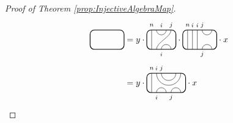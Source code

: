 \documentclass[11pt]{article}
\theoremstyle{plain}
\theoremstyle{definition}
\newcommand{\TLPlusPIso}[3]{
	\TLTStart
	\TLTThrough{#1}
	\TLTSnakeR{#2}{#3}
	\TLTEnd
}
\newcommand{\TLCapJoin}[5]{
	\TLTStart
	\TLTThrough{#1}
	\TLTCapJoin{#2}{#3}{#4}{#5}
	\TLTEnd
}
\newcommand{\TLTCalcLabelOffset}[3][0cm]{
	\settowidth{#2}{\scriptsize{$#3$}}
	\setlength{#2}{.5#2}
	\setlength{#2}{\maxof{#2}{#1}}
}
\newcommand{\TLTEnd}{
	\draw[thick, rounded corners = 5pt] (0,0) rectangle ($ (TLTlead) + (0,.8) $);
 \end{tikzpicture}
}
\newcommand{\TLTStart}{
 \begin{tikzpicture}[baseline=.3cm]
	\coordinate (TLTlead) at (.2,0); %
	\let\TLTlabelwidth\relax
	\newlength{\TLTlabelwidth}
}
\newcommand{\TLTThrough}[1]{
	\TLTCalcLabelOffset[.2cm]{\TLTlabelwidth}{#1}
	\coordinate (TLTlead) at ($ (TLTlead) + ({\TLTlabelwidth},0) $);
	\begin{scope}[shift=(TLTlead)]
		\draw (0,0) -- (0,.8);
		\node at (0,1) {\scriptsize{$#1$}};
	\end{scope}
		\coordinate (TLTlead) at ($ (TLTlead) + ({\TLTlabelwidth},0) $);
}
\newcommand{\TLTCapcup}[1]{
	\TLTCalcLabelOffset[.2cm]{\TLTlabelwidth}{#1}
		\coordinate (TLTlead) at ($ (TLTlead) + ({\TLTlabelwidth},0) $);
	\begin{scope}[shift=(TLTlead)]
		\draw (0,0) arc (180:0:.2);
		\draw (0,.8) arc (-180:0:.2);
		\node at (0,1) {\scriptsize{$#1$}};
	\end{scope}
	\TLTCalcLabelOffset[.5cm]{\TLTlabelwidth}{#1}
	\coordinate (TLTlead) at ($ (TLTlead) + ({\TLTlabelwidth},0)$);
}
\newcommand{\TLTSnakeR}[2]{
	\let\TLTscwidth\relax
	\newlength{\TLTscwidth}
	\let\TLTsswidth\relax
	\newlength{\TLTsswidth}
	\TLTCalcLabelOffset[.2cm]{\TLTscwidth}{#1}
	\TLTCalcLabelOffset[.5cm]{\TLTsswidth}{#2}
	\setlength{\TLTlabelwidth}{\TLTscwidth+\TLTsswidth}
	\setlength{\TLTlabelwidth}{\maxof{\TLTlabelwidth}{.7cm}} %
	\coordinate (TLTlead) at ($ (TLTlead) + ({\TLTscwidth},0) $);
	\begin{scope}[shift=(TLTlead)]
		\draw (.1,.8) arc (-180:0:.2cm);
		\draw (.1,0) .. controls ++(90:.3cm) and ++(270:.3cm) .. ($ (.1,.8) + ({\TLTlabelwidth},0) $);
		\draw ($ (.1,0) + ({\TLTsswidth},0) $) arc (180:0:.2cm);
		\node at (.1,1) {\scriptsize{$#1$}};
		\node at ($ (.1,1) + ({\TLTlabelwidth},0) $) {\scriptsize{$#2$}};
		\node at ($ (.1,-.2) + ({\TLTsswidth},0) $) {\scriptsize{$#1$}};
	\end{scope}
	\coordinate (TLTlead) at ($ (TLTlead) + ({\TLTlabelwidth+\TLTsswidth},0) $);
}
\newcommand{\TLTCapJoin}[4]{
	\let\TLTjoinlwidth\relax
	\newlength{\TLTjoinlwidth}
	\let\TLTjoinrwidth\relax
	\newlength{\TLTjoinrwidth}
	\let\TLTsplitlwidth\relax
	\newlength{\TLTsplitlwidth}
	\let\TLTsplitrwidth\relax
	\newlength{\TLTsplitrwidth}
	\TLTCalcLabelOffset[.8cm]{\TLTjoinrwidth}{#4} %
	\TLTCalcLabelOffset[.15cm]{\TLTjoinlwidth}{#3} %
	\TLTCalcLabelOffset[.6cm]{\TLTsplitlwidth}{#1}
	\TLTCalcLabelOffset[.6cm]{\TLTsplitrwidth}{#2}
	\setlength{\TLTlabelwidth}{\maxof{\TLTjoinlwidth}{\TLTsplitlwidth}}
	\coordinate (TLTlead) at ($ (TLTlead) + ({\TLTlabelwidth},0) $);
	\setlength{\TLTlabelwidth}{\maxof{\TLTjoinrwidth}{\TLTsplitrwidth}} %
 \begin{scope}[shift=(TLTlead)]
		\draw (0,.8) arc (-180:0:.5);
		\draw (0.2,.8) arc (-180:0:.3);
		\draw (0,0) arc (180:0:.2);
		\draw ({\TLTsplitlwidth},0) arc (180:0:.2);
		\node at (0,1) {\scriptsize{$#4$}};
		\node at ({\TLTjoinlwidth},1) {\scriptsize{$#3$}};
		\node at (0,-.2) {\scriptsize{$#1$}};
		\node at ({\TLTsplitlwidth},-.2) {\scriptsize{$#2$}};
	\end{scope}
	\coordinate (TLTlead) at ($ (TLTlead) + ({\TLTlabelwidth},0) $);
}
\begin{document}
\begin{proof}[Proof of Theorem \ref{prop:InjectiveAlgebraMap}]
\begin{align*}
\begin{tikzpicture}[baseline=.3cm]
		\draw[thick, rounded corners = 5pt] (0,0) rectangle (1.4,.8);
	\end{tikzpicture}
	&= y\cdot
	\begin{tikzpicture}[baseline=.3cm]
		\draw (.2,0) -- (.2,.8);
		\node at (.2,1) {\scriptsize{$n$}};
		\draw (.6,0) arc (180:0:.2cm);
		\node at (.6,-.2) {\scriptsize{$i$}};
		\draw (.4,0) .. controls ++(90:.3cm) and ++(270:.3cm) .. (1,.8);
		\node at (1,1) {\scriptsize{$j$}};
		\draw (.4,.8) arc (-180:0:.2cm);
		\node at (.6,1) {\scriptsize{$i$}};
		\draw[thick, rounded corners = 5pt] (0,0) rectangle (1.2,.8);
	\end{tikzpicture}
	\cdot
	\begin{tikzpicture}[baseline=.3cm]
		\draw (.2,0) -- (.2,.8);
		\node at (.2,1) {\scriptsize{$n$}};
		\draw (.4,0) -- (.4,.8);
		\node at (.4,1) {\scriptsize{$i$}};
		\draw (.6,0) -- (.6,.8);
		\node at (.6,1) {\scriptsize{$i$}};
		\draw (.8,0) arc (180:0:.2cm);
		\node at (.8,-.2) {\scriptsize{$j$}};
		\draw (.8,.8) arc (-180:0:.2cm);
		\node at (.8,1) {\scriptsize{$j$}};
		\draw[thick, rounded corners = 5pt] (0,0) rectangle (1.4,.8);
	\end{tikzpicture}
	\cdot x\\ %
	&= y\cdot 
	\begin{tikzpicture}[baseline=.3cm]
		\draw (.2,0) -- (.2,.8);
		\node at (.2,1) {\scriptsize{$n$}};
		\draw (.4,0) arc (180:0:.2cm);
		\node at (.4,-.2) {\scriptsize{$i$}};
		\draw (1,0) arc (180:0:.2cm);
		\node at (1,-.2) {\scriptsize{$j$}};
		\draw (.4,.8) arc (-180:0:.5cm);
		\node at (.4,1) {\scriptsize{$i$}};
		\draw (.6,.8) arc (-180:0:.3cm);
		\node at (.6,1) {\scriptsize{$j$}};
		\draw[thick, rounded corners = 5pt] (0,0) rectangle (1.6,.8);
	\end{tikzpicture}
	\cdot x %
\end{align*}

\end{proof}
\end{document}
